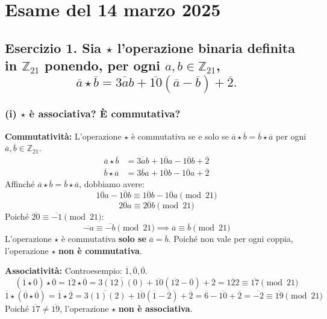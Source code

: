 \section{Esame del 14 marzo 2025}

\subsection*{Esercizio 1. Sia $\star$ l'operazione binaria definita in $\mathbb{Z}_{21}$ ponendo, per ogni $a, b \in \mathbb{Z}_{21}$,
$$ \overline{a} \star \overline{b} = \overline{3ab} + \overline{10}(\overline{a} - \overline{b}) + \overline{2}. $$}

\subsubsection*{(i) $\star$ è associativa? È commutativa?}

\textbf{Commutatività:}
L'operazione $\star$ è commutativa se e solo se $\overline{a} \star \overline{b} = \overline{b} \star \overline{a}$ per ogni $\overline{a}, \overline{b} \in \mathbb{Z}_{21}$.
\begin{align*}
\overline{a} \star \overline{b} &= \overline{3ab} + \overline{10a} - \overline{10b} + \overline{2} \\
\overline{b} \star \overline{a} &= \overline{3ba} + \overline{10b} - \overline{10a} + \overline{2}
\end{align*}
Affinché $\overline{a} \star \overline{b} = \overline{b} \star \overline{a}$, dobbiamo avere:
$$ \overline{10a} - \overline{10b} \equiv \overline{10b} - \overline{10a} \pmod{21} $$
$$ \overline{20a} \equiv \overline{20b} \pmod{21} $$
Poiché $\overline{20} \equiv \overline{-1} \pmod{21}$:
$$ \overline{-a} \equiv \overline{-b} \pmod{21} \implies \overline{a} \equiv \overline{b} \pmod{21} $$
L'operazione $\star$ è commutativa \textbf{solo se} $\overline{a} = \overline{b}$. Poiché non vale per ogni coppia, l'operazione $\star$ \textbf{non è commutativa}.

\textbf{Associatività:}
Controesempio: $\overline{1}, \overline{0}, \overline{0}$.
$$ (\overline{1} \star \overline{0}) \star \overline{0} = \overline{12} \star \overline{0} = \overline{3(12)(0)} + \overline{10}(\overline{12} - \overline{0}) + \overline{2} = \overline{122} \equiv \overline{17} \pmod{21} $$
$$ \overline{1} \star (\overline{0} \star \overline{0}) = \overline{1} \star \overline{2} = \overline{3(1)(2)} + \overline{10}(\overline{1} - \overline{2}) + \overline{2} = \overline{6} - \overline{10} + \overline{2} = \overline{-2} \equiv \overline{19} \pmod{21} $$
Poiché $\overline{17} \ne \overline{19}$, l'operazione $\star$ \textbf{non è associativa}.

